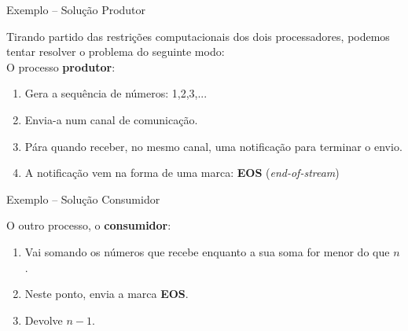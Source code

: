 \begin{frame}{Exemplo -- Solução \hfill \color{mLightBrown}Produtor}

  Tirando partido das restrições computacionais dos dois processadores, podemos tentar resolver o problema do seguinte modo:\\
  \pause
  \vspace*{3mm}
 O processo \textbf{produtor}:
  \begin{enumerate}
  \item Gera a sequência de números: 1,2,3,...
    \pause
  \item Envia-a num canal de comunicação.
    \pause
  \item Pára quando receber, no mesmo canal, uma notificação para terminar o envio.
    \pause
  \item A notificação vem na forma de uma marca: \textbf{EOS} (\textit{end-of-stream})
  \end{enumerate}

\end{frame}


\begin{frame}{Exemplo -- Solução \hfill \color{mLightBrown}Consumidor}

  O outro processo, o \textbf{consumidor}:
  \vspace{2mm}
  \begin{enumerate}
  \item Vai somando os números que recebe enquanto a sua soma for menor do que $n$.
    \pause
    \vspace{5mm}
  \item Neste ponto, envia a marca \textbf{EOS}.
        \pause
    \vspace{5mm}
  \item Devolve $n-1$.
  \end{enumerate}
\end{frame}

